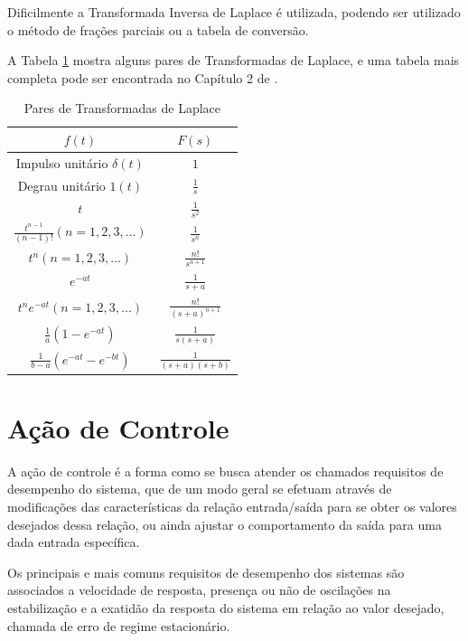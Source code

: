 Dificilmente a Transformada Inversa de Laplace é utilizada, podendo ser utilizado o método de frações parciais ou a tabela de conversão.

A Tabela \ref{tab:Laplace} mostra alguns pares de Transformadas de Laplace, e uma tabela mais completa pode ser encontrada no Capítulo 2 de \cite{Ogata}. 

\begin{table}[h]
\centering
\caption{Pares de Transformadas de Laplace}
\label{tab:Laplace}
\begin{tabular}{c|c}
\hline
$f(t)$ & $F(s)$ \\
\hline
\hline
Impulso unitário $\delta(t)$ 		& $1$ 			\\ \hline
Degrau unitário $1(t)$ 			& $\frac{1}{s}$		\\ \hline
$t$ 					& $\frac{1}{s^2}$ 	\\ \hline
$\frac{t^{n-1}}{(n-1)!} (n=1,2,3,...)$ 	& $\frac{1}{s^n}$ 	\\ \hline
$t^n (n=1,2,3,...)$ 			& $\frac{n!}{s^{n+1}}$ 	\\ \hline
$e^{-at}$ 				& $\frac{1}{s+a}$ 	\\ \hline
$t^n e^{-at} (n=1,2,3,...)$ 		& $\frac{n!}{(s+a)^{n+1}}$ \\\hline
$\frac{1}{a} (1-e^{-at})$ 		& $\frac{1}{s(s+a)}$ 	\\ \hline
$\frac{1}{b-a}(e^{-at}-e^{-bt})$ 	& $\frac{1}{(s+a)(s+b)}$ \\ \hline
\end{tabular}
\end{table}





\section{Ação de Controle}



A ação de controle é a forma como se busca atender os chamados requisitos de desempenho do sistema, 
que de um modo geral se efetuam através de modificações das características da relação entrada/saída para se obter os valores desejados dessa relação, 
ou ainda ajustar o comportamento da saída para uma dada entrada específica.


Os principais e mais comuns requisitos de desempenho dos sistemas são associados a velocidade de resposta, 
presença ou não de oscilações na estabilização e 
a exatidão da resposta do sistema em relação ao valor desejado, 
chamada de erro de regime estacionário.


